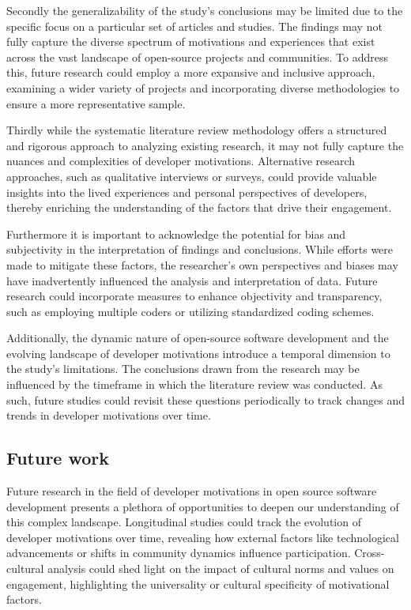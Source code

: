 Secondly the generalizability of the study's conclusions may be limited due to the specific focus on a particular set of articles and studies. The findings may not fully capture the diverse spectrum of motivations and experiences that exist across the vast landscape of open-source projects and communities. To address this, future research could employ a more expansive and inclusive approach, examining a wider variety of projects and incorporating diverse methodologies to ensure a more representative sample.

Thirdly while the systematic literature review methodology offers a structured and rigorous approach to analyzing existing research, it may not fully capture the nuances and complexities of developer motivations. Alternative research approaches, such as qualitative interviews or surveys, could provide valuable insights into the lived experiences and personal perspectives of developers, thereby enriching the understanding of the factors that drive their engagement.

Furthermore it is important to acknowledge the potential for bias and subjectivity in the interpretation of findings and conclusions. While efforts were made to mitigate these factors, the researcher's own perspectives and biases may have inadvertently influenced the analysis and interpretation of data. Future research could incorporate measures to enhance objectivity and transparency, such as employing multiple coders or utilizing standardized coding schemes.

Additionally, the dynamic nature of open-source software development and the evolving landscape of developer motivations introduce a temporal dimension to the study's limitations. The conclusions drawn from the research may be influenced by the timeframe in which the literature review was conducted. As such, future studies could revisit these questions periodically to track changes and trends in developer motivations over time.


\subsection{Future work}

Future research in the field of developer motivations in open source software development presents a plethora of opportunities to deepen our understanding of this complex landscape.  Longitudinal studies could track the evolution of developer motivations over time, revealing how external factors like technological advancements or shifts in community dynamics influence participation.  Cross-cultural analysis could shed light on the impact of cultural norms and values on engagement, highlighting the universality or cultural specificity of motivational factors.

